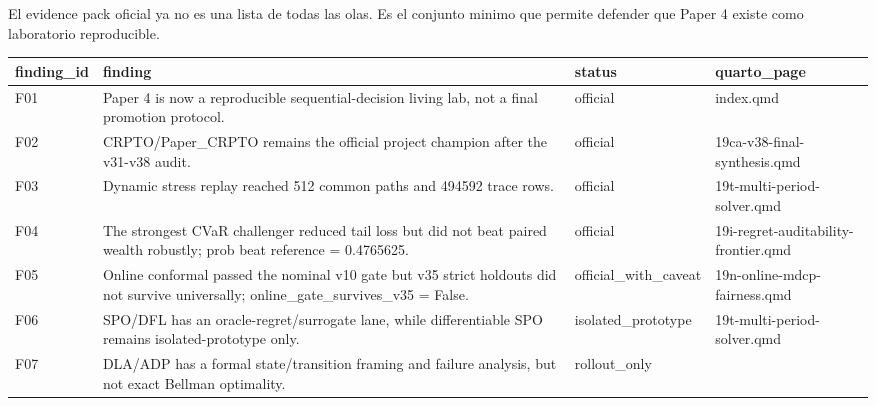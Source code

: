 \documentclass[
  spanish,
  11pt,
  letterpaper,
]{scrbook}
\newcounter{none} %
\theoremstyle{plain}
\theoremstyle{remark}
\begin{document}
El evidence pack oficial ya no es una lista de todas las olas. Es el
conjunto minimo que permite defender que Paper 4 existe como laboratorio
reproducible.

{\def\LTcaptype{none} %
\begin{longtable}[]{@{}
  >{\raggedright\arraybackslash}p{}
  >{\raggedright\arraybackslash}p{}
  >{\raggedright\arraybackslash}p{}
  >{\raggedright\arraybackslash}p{}@{}}
\toprule\noalign{}
\begin{minipage}[b]{\linewidth}\raggedright
finding\_id
\end{minipage} & \begin{minipage}[b]{\linewidth}\raggedright
finding
\end{minipage} & \begin{minipage}[b]{\linewidth}\raggedright
status
\end{minipage} & \begin{minipage}[b]{\linewidth}\raggedright
quarto\_page
\end{minipage} \\
\midrule\noalign{}
\endhead
\bottomrule\noalign{}
\endlastfoot
F01 & Paper 4 is now a reproducible sequential-decision living lab, not
a final promotion protocol. & official & index.qmd \\
F02 & CRPTO/Paper\_CRPTO remains the official project champion after the
v31-v38 audit. & official & 19ca-v38-final-synthesis.qmd \\
F03 & Dynamic stress replay reached 512 common paths and 494592 trace
rows. & official & 19t-multi-period-solver.qmd \\
F04 & The strongest CVaR challenger reduced tail loss but did not beat
paired wealth robustly; prob beat reference = 0.4765625. & official &
19i-regret-auditability-frontier.qmd \\
F05 & Online conformal passed the nominal v10 gate but v35 strict
holdouts did not survive universally; online\_gate\_survives\_v35 =
False. & official\_with\_caveat & 19n-online-mdcp-fairness.qmd \\
F06 & SPO/DFL has an oracle-regret/surrogate lane, while differentiable
SPO remains isolated-prototype only. & isolated\_prototype &
19t-multi-period-solver.qmd \\
F07 & DLA/ADP has a formal state/transition framing and failure
analysis, but not exact Bellman optimality. & rollout\_only &

\end{longtable}}
\end{document}
